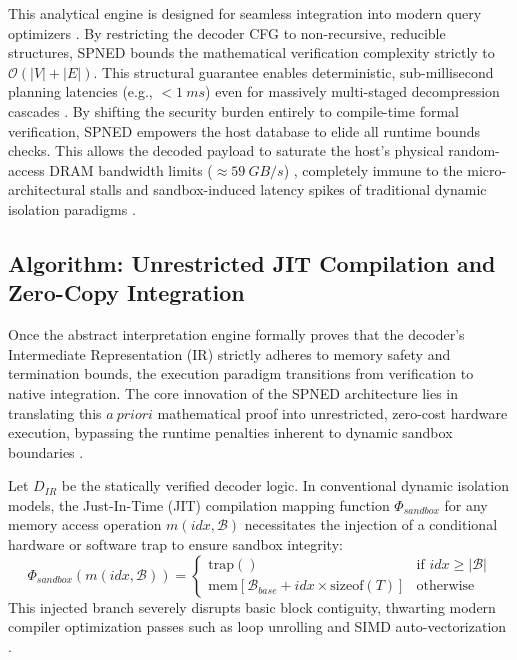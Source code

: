 \documentclass[onecolumn]{IEEEtran}
\numberwithin{equation}{section}
\theoremstyle{definition}
\theoremstyle{remark}
\begin{document}
This analytical engine is designed for seamless integration into modern query optimizers \cite{anneser2023autosteer}. By restricting the decoder CFG to non-recursive, reducible structures, SPNED bounds the mathematical verification complexity strictly to $\mathcal{O}(|V| + |E|)$. This structural guarantee enables deterministic, sub-millisecond planning latencies (e.g., $< \SI{1}{ms}$) even for massively multi-staged decompression cascades \cite{kuschewski2023btrblocks}. By shifting the security burden entirely to compile-time formal verification, SPNED empowers the host database to elide all runtime bounds checks. This allows the decoded payload to saturate the host's physical random-access DRAM bandwidth limits ($\approx \SI{59}{GB/s}$) \cite{leis2014morsel}, completely immune to the micro-architectural stalls and sandbox-induced latency spikes of traditional dynamic isolation paradigms \cite{gienieczko2025anyblox, watt2018mechanising}.




\subsection{Algorithm: Unrestricted JIT Compilation and Zero-Copy Integration}

Once the abstract interpretation engine formally proves that the decoder's Intermediate Representation (IR) strictly adheres to memory safety and termination bounds, the execution paradigm transitions from verification to native integration. The core innovation of the SPNED architecture lies in translating this $a~priori$ mathematical proof into unrestricted, zero-cost hardware execution, bypassing the runtime penalties inherent to dynamic sandbox boundaries \cite{gienieczko2025anyblox, watt2018mechanising}.

Let $D_{IR}$ be the statically verified decoder logic. In conventional dynamic isolation models, the Just-In-Time (JIT) compilation mapping function $\Phi_{sandbox}$ for any memory access operation $m(idx, \mathcal{B})$ necessitates the injection of a conditional hardware or software trap to ensure sandbox integrity:
\begin{equation}
    \Phi_{sandbox}(m(idx, \mathcal{B})) = 
    \begin{cases} 
        \text{trap}() & \text{if } idx \ge |\mathcal{B}| \\ 
        \text{mem}[\mathcal{B}_{base} + idx \times \text{sizeof}(T)] & \text{otherwise} 
    \end{cases}
\end{equation}
This injected branch severely disrupts basic block contiguity, thwarting modern compiler optimization passes such as loop unrolling and SIMD auto-vectorization \cite{lattner2004llvm}. 
\end{document}

